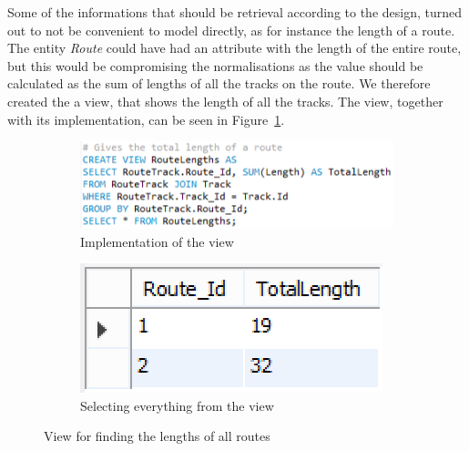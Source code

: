 Some of the informations that should be retrieval according to the design, 
turned out to not be convenient to model directly, as for instance the length 
of a route. The entity \emph{Route} could have had an attribute with the length 
of the entire route, but this would be compromising the normalisations as the 
value should be calculated as the sum of lengths of all the tracks on the 
route. We therefore created the a view, that shows the length of all the 
tracks. The view, together with its implementation, can be seen in 
Figure~\ref{fig:length}.

\begin{figure}[h]
    \centering
    \begin{subfigure}[b]{0.45 \textwidth}
        \centering
        \includegraphics[width=\textwidth]{img/RouteLengths}
        \caption{Implementation of the view}
    \end{subfigure}
    \begin{subfigure}[b]{0.45 \textwidth}
        \centering
        \includegraphics{img/RouteLengthsView}
        \caption{Selecting everything from the view}
    \end{subfigure}
    \caption{View for finding the lengths of all routes}
    \label{fig:length}
\end{figure}

